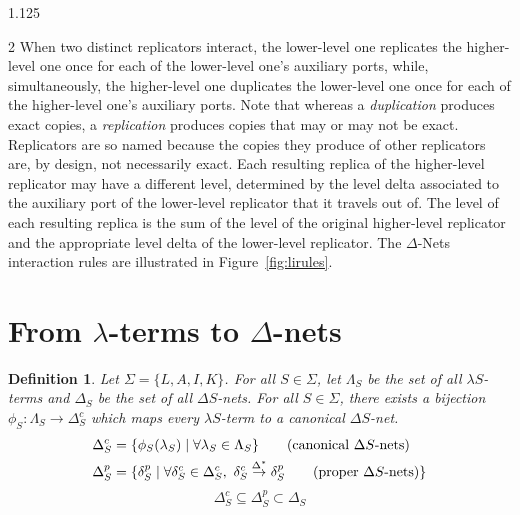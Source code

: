 \documentclass[10pt]{article}
\begin{document}
\begin{spacing}{1.125}
\begin{multicols}{2}
When two distinct replicators interact, the lower-level one replicates the higher-level one once for each of the lower-level one's auxiliary ports, while, simultaneously, the higher-level one duplicates the lower-level one once for each of the higher-level one's auxiliary ports. Note that whereas a \textit{duplication} produces exact copies, a \textit{replication} produces copies that may or may not be exact.
Replicators are so named because the copies they produce of other replicators are, by design, not necessarily exact. Each resulting replica of the higher-level replicator may have a different level, determined by the level delta associated to the auxiliary port of the lower-level replicator that it travels out of. The level of each resulting replica is the sum of the level of the original higher-level replicator and the appropriate level delta of the lower-level replicator. The \mbox{$\Delta$-Nets} interaction rules are illustrated in \mbox{Figure \ref{fig:lirules}}.

\section{From \mbox{$\lambda$-terms} to \mbox{$\Delta$-nets}}

\theoremstyle{plain}
\newtheorem*{definition}{Definition}
\newtheorem*{theorem}{Theorem}
\newtheorem*{corollary}{Corollary}

\begin{definition}
Let \mbox{$\Sigma = \{L,A,I,K\}$}. For all \mbox{$S \in \Sigma$}, let $\Lambda_S$ be the set of all \mbox{$\lambda S$-terms} and $\Delta_S$ be the set of all \mbox{$\Delta S$-nets}.
For all \mbox{$S \in \Sigma$}, there exists a bijection \mbox{$\phi_S: \Lambda_S \rightarrow \Delta_S^{c}$} which maps every \mbox{$\lambda S$-term} to a \emph{canonical} \mbox{$\Delta S$-net}.
\begin{align*}
\Delta_S^{c} &= \{ \phi_S(\lambda_S) \mid \forall \lambda_S \in \Lambda_S\} \tag{canonical \mbox{$\Delta S$-nets}} \\
\Delta_S^{p} &= \{ \delta_S^p \mid \forall \delta_S^c \in \Delta_S^{c},\ \delta_S^c \stackrel{\Delta^*}{\to} \delta_S^p \tag{proper \mbox{$\Delta S$-nets}} \}
\end{align*}
\[
  \Delta_S^{c} \subseteq \Delta_S^{p} \subset \Delta_S
\]
\end{definition}


\end{multicols}
\end{spacing}
\end{document}
